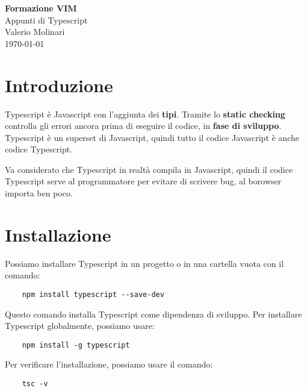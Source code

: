 \documentclass[12pt]{article}
\begin{document}
\begin{titlepage}
\begin{center}
\vspace*{3cm}
\Huge\textcolor{primary}{\textbf{Formazione VIM}} \\[1cm]
\Large\textcolor{secondary}{Appunti di Typescript} \\[1cm]
\textcolor{accent}{Valerio Molinari}\\
\vfill
\today
\end{center}
\end{titlepage}

\tableofcontents
\newpage

\section{Introduzione}
Typescript è Javascript con l'aggiunta dei \textbf{tipi}. Tramite lo \textbf{static checking}
controlla gli errori ancora prima di eseguire il codice, in \textbf{fase di sviluppo}.
Typescript è un superset di Javascript, quindi tutto il codice Javascript è anche codice Typescript.

Va considerato che Typescript in realtà compila in Javascript,
quindi il codice Typescript serve al programmatore per evitare di
scrivere bug, al borowser importa ben poco.

\section{Installazione}
Possiamo installare Typescript in un progetto
o in una cartella vuota con il comando:
\begin{highlight}
    \begin{verbatim}
    npm install typescript --save-dev
    \end{verbatim}
\end{highlight}
Questo comando installa Typescript come dipendenza di sviluppo.
Per installare Typescript globalmente, possiamo usare:
\begin{highlight}
    \begin{verbatim}
    npm install -g typescript
    \end{verbatim}
\end{highlight}
Per verificare l'installazione, possiamo usare il comando:
\begin{highlight}
    \begin{verbatim}
    tsc -v
    \end{verbatim}
\end{highlight}
\end{document}
